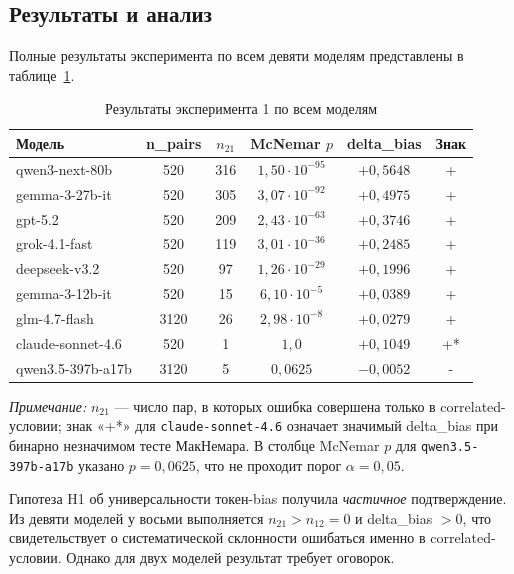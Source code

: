 \subsection{Результаты и анализ}

Полные результаты эксперимента по всем девяти моделям представлены в таблице~\ref{tab:linda_results}.

\begin{table}[h!]
\caption{Результаты эксперимента 1 по всем моделям}
\label{tab:linda_results}
\centering
\begin{tabular}{|l|c|c|c|c|c|}
\hline
\textbf{Модель} & \textbf{n\_pairs} & \textbf{$n_{21}$} & \textbf{McNemar $p$} & \textbf{delta\_bias} & \textbf{Знак} \\
\hline
qwen3-next-80b   & 520  & 316 & $1{,}50 \cdot 10^{-95}$ & $+0{,}5648$ & + \\
gemma-3-27b-it   & 520  & 305 & $3{,}07 \cdot 10^{-92}$ & $+0{,}4975$ & + \\
gpt-5.2          & 520  & 209 & $2{,}43 \cdot 10^{-63}$ & $+0{,}3746$ & + \\
grok-4.1-fast    & 520  & 119 & $3{,}01 \cdot 10^{-36}$ & $+0{,}2485$ & + \\
deepseek-v3.2    & 520  & 97  & $1{,}26 \cdot 10^{-29}$ & $+0{,}1996$ & + \\
gemma-3-12b-it   & 520  & 15  & $6{,}10 \cdot 10^{-5}$   & $+0{,}0389$ & + \\
glm-4.7-flash    & 3120 & 26  & $2{,}98 \cdot 10^{-8}$  & $+0{,}0279$ & + \\
claude-sonnet-4.6 & 520 & 1   & $1{,}0$                 & $+0{,}1049$ & +* \\
qwen3.5-397b-a17b & 3120 & 5  & $0{,}0625$              & $-0{,}0052$ & - \\
\hline
\end{tabular}
\end{table}

\textit{Примечание:} $n_{21}$ --- число пар, в которых ошибка совершена только в correlated-условии; знак «+*» для \texttt{claude-sonnet-4.6} означает значимый delta\_bias при бинарно незначимом тесте МакНемара. В столбце McNemar $p$ для \texttt{qwen3.5-397b-a17b} указано $p = 0{,}0625$, что не проходит порог $\alpha = 0{,}05$.

Гипотеза H1 об универсальности токен-bias получила \textit{частичное} подтверждение. Из девяти моделей у восьми выполняется $n_{21} > n_{12} = 0$ и delta\_bias $> 0$, что свидетельствует о систематической склонности ошибаться именно в correlated-условии. Однако для двух моделей результат требует оговорок.

